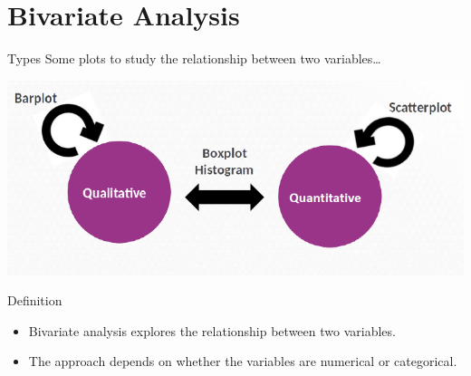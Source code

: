 \documentclass[
  ignorenonframetext,
]{beamer}
\providecommand{\tightlist}{%
  \setlength{\itemsep}{0pt}\setlength{\parskip}{0pt}}
\begin{document}
\section{Bivariate Analysis}\label{bivariate-analysis-1}

\begin{frame}{Types}
\label{types}
Some plots to study the relationship between two variables\ldots{}

\includegraphics{images/types.png}
\end{frame}

\begin{frame}{Definition}
\label{definition}
\begin{itemize}
\tightlist
\item
  Bivariate analysis explores the relationship between two variables.
\item
  The approach depends on whether the variables are numerical or
  categorical.
\end{itemize}
\end{frame}
\end{document}
